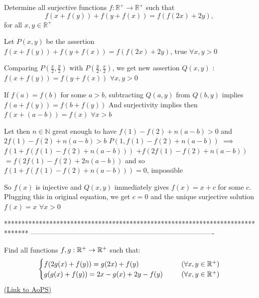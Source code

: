 \begin{solution}
	\begin{tcolorbox}Determine all surjective functions $f : \mathbb{R}^+ \to \mathbb{R}^+$ such that \[f(x+f(y))+f(y+f(x))=f(f(2x)+2y) ,\]
       for all $x,y \in \mathbb{R}^+$\end{tcolorbox}
Let $P(x,y)$ be the assertion $f(x+f(y))+f(y+f(x))=f(f(2x)+2y)$, true $\forall x,y>0$

Comparing $P(\frac x2,\frac y2)$ with $P(\frac y2,\frac x2)$, we get new assertion $Q(x,y)$ : $f(x+f(y))=f(y+f(x))$ $\forall x,y>0$

If $f(a)=f(b)$ for some $a>b$, subtracting $Q(a,y)$ from $Q(b,y)$ implies $f(a+f(y))=f(b+f(y))$
And surjectivity implies then $f(x+(a-b))=f(x)$ $\forall x>b$

Let then $n\in\mathbb N$ great enough to have $f(1)-f(2)+n(a-b)>0$ and $2f(1)-f(2)+n(a-b)>b$
$P(1,f(1)-f(2)+n(a-b))$ $\implies$ $f(1+f(f(1)-f(2)+n(a-b)))$ $+f(2f(1)-f(2)+n(a-b))$ $=f(2f(1)-f(2)+2n(a-b))$ and so $f(1+f(f(1)-f(2)+n(a-b)))=0$, impossible

So $f(x)$ is injective and $Q(x,y)$ immediately gives $f(x)=x+c$ for some $c$.
Plugging this in original equation, we get $c=0$ and the unique surjective solution $\boxed{f(x)=x}$ $\forall x>0$
\end{solution}
*******************************************************************************
-------------------------------------------------------------------------------

\begin{problem}
	Find all functions $f,g:\Bbb{R}^+ \to \Bbb{R}^+$ such that: 
\[ \begin{cases} 
f(2g(x)+f(y))=g(2x)+f(y) & (\forall x,y\in \Bbb{R}^+) \\ 
g(g(x)+f(y))=2x-g(x)+2y-f(y) \ \ \ \ \   & (\forall x,y\in \Bbb{R}^+)
 \end{cases} \]
	\flushright \href{https://artofproblemsolving.com/community/c6h558087}{(Link to AoPS)}
\end{problem}



